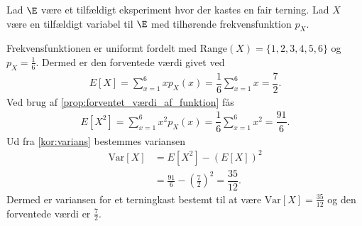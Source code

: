 \begin{eks} \textbf{} \label{eks:forv_og_var} %
\newline
Lad $\E$ være et tilfældigt eksperiment hvor der kastes en fair terning. Lad $X$ være en tilfældigt variabel til $\E$ med tilhørende frekvensfunktion $p_X$.


Frekvensfunktionen er uniformt fordelt med $\text{Range}(X)=\{1,2,3,4,5,6\}$ og $p_X=\frac{1}{6}$.
Dermed er den forventede værdi givet ved
\begin{align*}
    E[X]=\sum_{x=1}^6 xp_X(x) = \dfrac{1}{6}\sum_{x=1}^6 x=\dfrac{7}{2}.
\end{align*}
Ved brug af \autoref{prop:forventet_værdi_af_funktion} fås
\begin{align*}
    E[X^2]=\sum_{x=1}^6  x^2 p_X(x) = \dfrac{1}{6} \sum_{x=1}^6 x^2 = \dfrac{91}{6}.
\end{align*}
Ud fra \autoref{kor:varians} bestemmes variansen
\begin{align*}
    \text{Var}[X]  &=E[X^2]-\left(E[X]\right)^2\\
            &=\frac{91}{6} - \left(\frac{7}{2}\right)^2 = \dfrac{35}{12}.
\end{align*}
Dermed er variansen for et terningkast bestemt til at være $\text{Var}[X] = \displaystyle \frac{35}{12}$ og den forventede værdi er $\frac{7}{2}$.
\end{eks}

